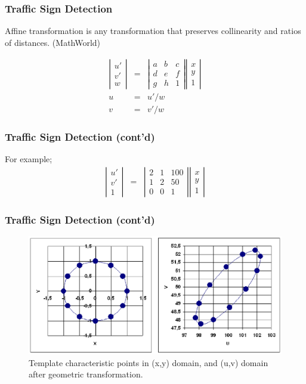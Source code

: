 \documentclass{beamer}
\begin{document}
\frame
{
  \frametitle{Traffic Sign Detection}
  \begin{block}{Affine transformation}
  is any transformation that preserves collinearity and ratios of distances. (MathWorld)
  \end{block}
  \begin{eqnarray}
	\label{eq5}
	\left| \begin{array}{ccc} u' \\ v' \\ w \end{array} \right| &=& 
	\left| \begin{array}{ccc} a & b & c \\ d & e & f \\ g & h & 1 \end{array} \right| \left| \begin{array}{ccc} x \\ y \\ 1 \end{array} \right| \\
	\nonumber u &=& u'/w \\
	\nonumber v &=& v'/w 
	\end{eqnarray}
}

\frame
{
  \frametitle{Traffic Sign Detection (cont'd)}
  For example;
  \begin{eqnarray}
  \label{eq6}
	\left| \begin{array}{ccc} u' \\ v' \\ 1 \end{array} \right| &=& 
	\left| \begin{array}{ccc} 2 & 1 & 100 \\ 1 & 2 & 50 \\ 0 & 0 & 1 \end{array} \right| \left| \begin{array}{ccc} x \\ y \\ 1 \end{array} \right|
	\end{eqnarray}

}

\frame
{
  \frametitle{Traffic Sign Detection (cont'd)}
  \begin{figure}[ht]
	\begin{center}
	\includegraphics[width=.8\paperwidth]{../img/sdfig6.eps}
	\caption{Template characteristic points in (x,y) domain,  and (u,v) domain after geometric transformation.}
	\label{fig:sdfig6}
	\end{center}
	\end{figure}
}
\end{document}
